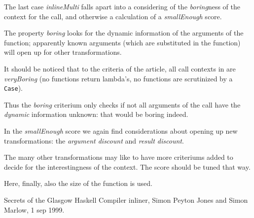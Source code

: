 \documentclass{article}
\begin{document}
The last case \emph{inlineMulti} falls apart into a considering of the \emph{boring}ness of the context for the call, and otherwise a calculation of a \emph{smallEnough} score.

The property \emph{boring} looks for the dynamic information of the arguments of the function; apparently known arguments (which are substituted in the function) will open up for other transformations.

It should be noticed that to the criteria of the article, all call contexts in \grin are \emph{veryBoring} (no functions return lambda's, no functions are scrutinized by a \texttt{Case}). 

Thus the \emph{boring} criterium only checks if not all arguments of the call have the \emph{dynamic} information unknown: that would be boring indeed.

In the \emph{smallEnough} score we again find considerations about opening up new transformations: the \emph{argument discount} and \emph{result discount}. 

The many other \grin transformations may like to have more criteriums added to decide for the interestingness of the context. The score should be tuned that way.

Here, finally, also the size of the function is used.

\begin{thebibliography}{Secrets}
 Secrets of the Glasgow Haskell Compiler inliner, Simon Peyton Jones and Simon Marlow, 1 sep 1999.
\end{thebibliography}
\end{document}
